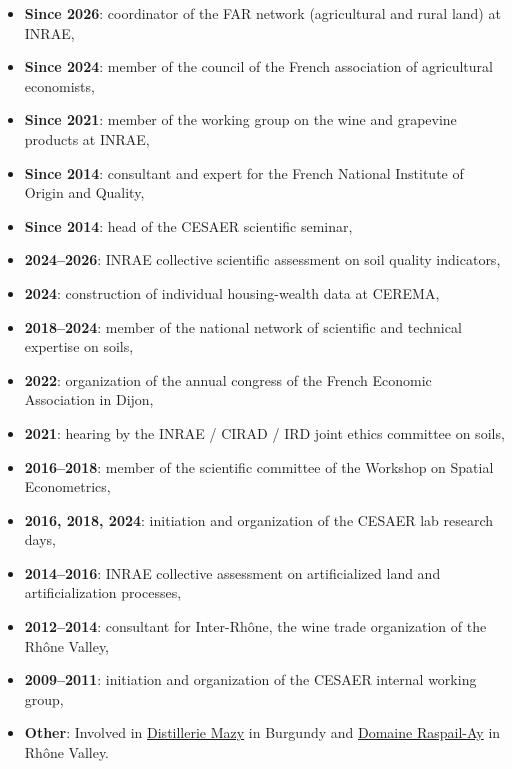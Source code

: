 \documentclass[12pt, a4paper]{./style}
\begin{document}
\begin{itemize}
\item \textbf{Since 2026}: coordinator of the FAR network (agricultural and rural land)
at INRAE,
\item \textbf{Since 2024}: member of the council of the French
association of agricultural economists,
\item \textbf{Since 2021}: member of the working group on the wine and
grapevine products at INRAE,
\item \textbf{Since 2014}: consultant and expert for the French
National Institute of Origin and Quality,
\item \textbf{Since 2014}: head of the CESAER scientific seminar,
\item \textbf{2024--2026}: INRAE collective scientific assessment on soil quality
indicators,
\item \textbf{2024}: construction of individual housing-wealth data at CEREMA,
\item \textbf{2018--2024}: member of the national network of
scientific and technical expertise on soils,
\item \textbf{2022}: organization of the annual congress of the
French Economic Association in Dijon,
\item \textbf{2021}: hearing by the INRAE / CIRAD / IRD joint ethics committee on
soils,
\item \textbf{2016--2018}: member of the scientific committee of the Workshop on
Spatial Econometrics,
\item \textbf{2016, 2018, 2024}: initiation and organization of the CESAER lab
research days,
\item \textbf{2014--2016}: INRAE collective assessment on
artificialized land and artificialization processes,
\item \textbf{2012--2014}: consultant for Inter-Rhône, the wine trade organization of
the Rhône Valley,
\item \textbf{2009--2011}: initiation and organization of the CESAER internal working
group,
\item \textbf{Other}: Involved in \href{https://distillerie-mazy.fr/}{Distillerie Mazy} in Burgundy and
\href{https://www.gigondas-vin.com/vigneron/domaine-raspail-ay/}{Domaine Raspail-Ay} in Rhône Valley.
\end{itemize}
\end{document}
